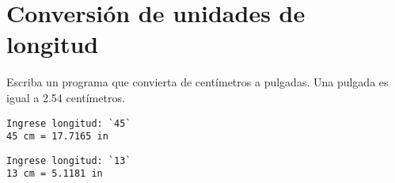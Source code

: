 \section{Conversión de unidades de longitud}

Escriba un programa que convierta de centímetros a pulgadas. Una pulgada
es igual a 2.54 centímetros.

\begin{lstlisting}[language=testcase]
Ingrese longitud: `45`
45 cm = 17.7165 in
\end{lstlisting}


\begin{lstlisting}[language=testcase]
Ingrese longitud: `13`
13 cm = 5.1181 in
\end{lstlisting}
